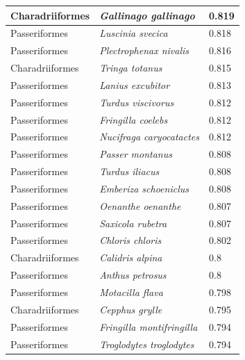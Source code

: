 \documentclass{article}
\begin{document}
\begin{longtable}{|p{} | p{} | p{} |}
  Charadriiformes & \textit{Gallinago gallinago}           & 0.819                \\ \hline
  Passeriformes   & \textit{Luscinia svecica}              & 0.818                \\ \hline
  Passeriformes   & \textit{Plectrophenax nivalis}         & 0.816                \\ \hline
  Charadriiformes & \textit{Tringa totanus}                & 0.815                \\ \hline
  Passeriformes   & \textit{Lanius excubitor}              & 0.813                \\ \hline
  Passeriformes   & \textit{Turdus viscivorus}             & 0.812                \\ \hline
  Passeriformes   & \textit{Fringilla coelebs}             & 0.812                \\ \hline
  Passeriformes   & \textit{Nucifraga caryocatactes}       & 0.812                \\ \hline
  Passeriformes   & \textit{Passer montanus}               & 0.808                \\ \hline
  Passeriformes   & \textit{Turdus iliacus}                & 0.808                \\ \hline
  Passeriformes   & \textit{Emberiza schoeniclus}          & 0.808                \\ \hline
  Passeriformes   & \textit{Oenanthe oenanthe}             & 0.807                \\ \hline
  Passeriformes   & \textit{Saxicola rubetra}              & 0.807                \\ \hline
  Passeriformes   & \textit{Chloris chloris}               & 0.802                \\ \hline
  Charadriiformes & \textit{Calidris alpina}               & 0.8                  \\ \hline
  Passeriformes   & \textit{Anthus petrosus}               & 0.8                  \\ \hline
  Passeriformes   & \textit{Motacilla flava}               & 0.798                \\ \hline
  Charadriiformes & \textit{Cepphus grylle}                & 0.795                \\ \hline
  Passeriformes   & \textit{Fringilla montifringilla}      & 0.794                \\ \hline
  Passeriformes   & \textit{Troglodytes troglodytes}       & 0.794                \\ \hline

\end{longtable}
\end{document}
